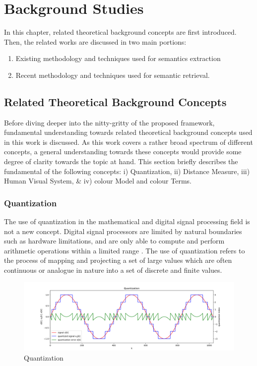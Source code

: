 


\chapter{Background Studies}
\label{section:litreview}

In this chapter, related theoretical background concepts are first introduced. Then, the related works are discussed in two main portions: 
\begin{enumerate}
    \item Existing methodology and techniques used for semantics extraction
    \item Recent methodology and techniques used for semantic retrieval.
\end{enumerate}



\section{Related Theoretical Background Concepts}
\label{subsec:relatedConcepts}

Before diving deeper into the nitty-gritty of the proposed framework, fundamental understanding towards related theoretical background concepts used in this work is discussed. As this work covers a rather broad spectrum of different concepts, a general understanding towards these concepts would provide some degree of clarity towards the topic at hand. This section briefly describes the fundamental of the following concepts: i) Quantization, ii) Distance Measure, iii) Human Visual System, \& iv) colour Model and colour Terms. 


\subsection{Quantization}

The use of quantization in the mathematical and digital signal processing field is not a new concept. Digital signal processors are limited by natural boundaries such as hardware limitations, and are only able to compute and perform arithmetic operations within a limited range \cite{spors_2018}. The use of quantization refers to the process of mapping and projecting a set of large values which are often continuous or analogue in nature into a set of discrete and finite values. 

\begin{figure}[hbt!]\centering
\includegraphics[width=\textwidth]{image/general/quantization.png}
\caption{Quantization}
\label{fig:quantize}
\end{figure}



